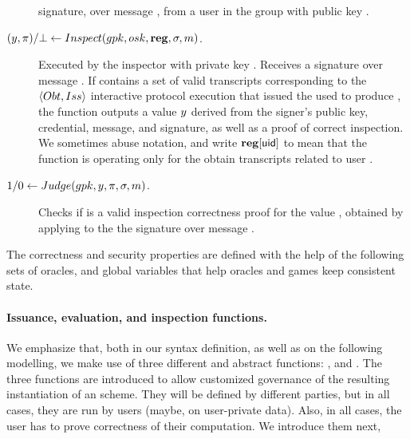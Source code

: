 \begin{description}
  signature, over message \msg, from a user in the group with public key \gpk.
\item[$(y,\pi)/\bot \gets Inspect(gpk,osk,\mathbf{reg},\sigma,m)$.] %
  Executed by the inspector with private key \osk. Receives a signature \sig
  over message \msg. If \trans contains a set of valid transcripts corresponding
  to the $\langle Obt,Iss\rangle$ interactive protocol execution that
  issued the used to produce \sig, the function outputs a value $y$ derived
  from the signer's public key, credential, message, and signature, as well as
  a proof of correct inspection. We sometimes abuse notation, and write
  $\mathbf{reg}[\mathsf{uid}]$ to mean that the \Inspect function is operating only for the
  obtain transcripts related to user \uid.
\item[$1/0 \gets Judge(gpk,y,\pi,\sigma,m)$.] %
  Checks if \iproof is a valid inspection correctness proof for the value \y,
  obtained by applying \Inspect to the the signature \sig over message \msg. 
\end{description}

The correctness and security properties are defined with the help of the
following sets of oracles, and global variables that help oracles and games
keep consistent state.

\paragraph{Issuance, evaluation, and inspection functions.} %
We emphasize that, both in our syntax definition, as well as on the following
modelling, we make use of three different and abstract functions: \fissue,
\feval and \finsp. The three functions are introduced to allow customized
governance of the resulting instantiation of an \UAS scheme. They will be
defined by different parties, but in all cases, they are run by users (maybe,
on user-private data). Also, in all cases, the user has to prove correctness of
their computation. We introduce them next, 


